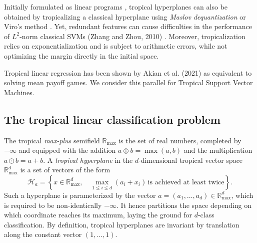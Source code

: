\documentclass[oneside,UKenglish,a4paper]{amsart}
\numberwithin{equation}{section}
\numberwithin{figure}{section}
\theoremstyle{plain}
\theoremstyle{definition}
\theoremstyle{plain}
\theoremstyle{remark}
\theoremstyle{plain}
\theoremstyle{definition}
\theoremstyle{definition}
\begin{document}
Initially formulated as linear programs \cite{Gartner2006}, tropical hyperplanes can also be obtained by tropicalizing a classical hyperplane using \emph{Maslov dequantization} \cite{litvinov2005maslov} or Viro's method \cite{viro2000dequantization}. Yet, redundant features can cause difficulties in the performance of $L^2$-norm classical SVMs (Zhang and Zhou, 2010) \cite{ZHANG2010373}. Moreover, tropicalization relies on exponentialization and is subject to arithmetic errors, while not optimizing the margin directly in the initial space.

Tropical linear regression has been shown by Akian et al. (2021) \cite{Akian2021TropicalLR} as equivalent to solving mean payoff games. We consider this parallel for Tropical Support Vector Machines.

\subsection*{The tropical linear classification problem}

The tropical \emph{max-plus} semifield $\mathbb{R}_{\max}$ is the
set of real numbers, completed by $-\infty$ and equipped with the
addition $a\oplus b=\max(a,b)$ and the multiplication $a\odot b=a+b$.
A \emph{tropical hyperplane} in the $d$-dimensional tropical vector
space $\mathbb{R}_{\max}^{d}$ is a set of vectors of the form
\begin{equation}
\mathcal{H}_{a}=\left\{x\in\mathbb{R}_{\max}^{d},\quad\max_{1\le i\le d}(a_{i}+x_{i})\,\text{is achieved at least twice}\right\}.\label{eq:unsigned}
\end{equation}
Such a hyperplane is parameterized by the vector $a=(a_{1},\ldots,a_{d})\in\mathbb{R}_{\max}^{d}$,
which is required to be non-identically $-\infty$. It hence partitions
the space depending on which coordinate reaches its maximum, laying the
ground for $d$-class classification. By definition, tropical hyperplanes are invariant by translation along the constant vector $(1,\ldots, 1)$.
\end{document}
